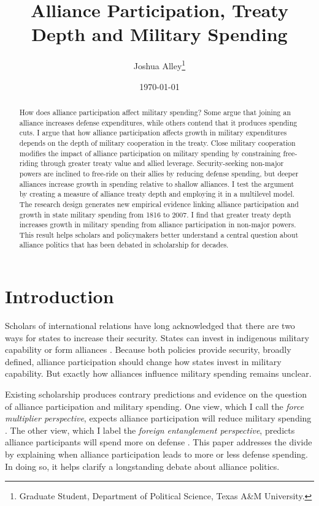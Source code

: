 \documentclass[12pt]{article}
\title{\textbf{Alliance Participation, Treaty Depth and Military Spending}}
\author{Joshua Alley\footnote{Graduate Student,
Department of Political Science, Texas A\&M University.}}
\date{{\normalsize \today}}
\begin{document}
\maketitle 

\doublespace 

\begin{abstract}
How does alliance participation affect military spending? 
Some argue that joining an alliance increases defense expenditures, while others contend that it produces spending cuts.
I argue that how alliance participation affects growth in military expenditures depends on the depth of military cooperation in the treaty. 
Close military cooperation modifies the impact of alliance participation on military spending by constraining free-riding through greater treaty value and allied leverage.
Security-seeking non-major powers are inclined to free-ride on their allies by reducing defense spending, but deeper alliances increase growth in spending relative to shallow alliances.    
I test the argument by creating a measure of alliance treaty depth and employing it in a multilevel model. 
The research design generates new empirical evidence linking alliance participation and growth in state military spending from 1816 to 2007. 
I find that greater treaty depth increases growth in military spending from alliance participation in non-major powers.  
This result helps scholars and policymakers better understand a central question about alliance politics that has been debated in scholarship for decades. 
\end{abstract}


 \newpage 


\section{Introduction}


Scholars of international relations have long acknowledged that there are two ways for states to increase their security. 
States can invest in indigenous military capability or form alliances \citep{Morgenthau1948, Altfield1984, Morrow1993}.
Because both policies provide security, broadly defined, alliance participation should change how states invest in military capability. 
But exactly how alliances influence military spending remains unclear. 


Existing scholarship produces contrary predictions and evidence on the question of alliance participation and military spending. 
One view, which I call the \textit{force multiplier perspective}, expects alliance participation will reduce military spending \citep{Morrow1993, Conybeare1994, DigiuseppePoast2016}. 
The other view, which I label the \textit{foreign entanglement perspective}, predicts alliance participants will spend more on defense \citep{Diehl1994, MorganPalmer2006}.
This paper addresses the divide by explaining when alliance participation leads to more or less defense spending. 
In doing so, it helps clarify a longstanding debate about alliance politics.
\end{document}
